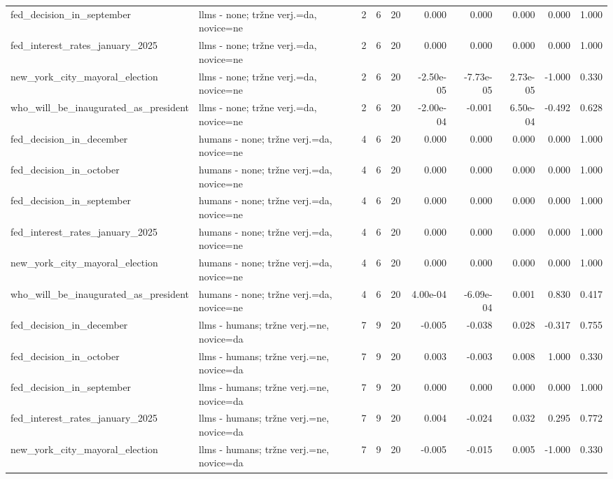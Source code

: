 \begin{longtable}{llrrrrrrrr}
fed\_decision\_in\_september & llms - none; tržne verj.=da, novice=ne & 2 & 6 & 20 & 0.000 & 0.000 & 0.000 & 0.000 & 1.000 \\
fed\_interest\_rates\_january\_2025 & llms - none; tržne verj.=da, novice=ne & 2 & 6 & 20 & 0.000 & 0.000 & 0.000 & 0.000 & 1.000 \\
new\_york\_city\_mayoral\_election & llms - none; tržne verj.=da, novice=ne & 2 & 6 & 20 & -2.50e-05 & -7.73e-05 & 2.73e-05 & -1.000 & 0.330 \\
who\_will\_be\_inaugurated\_as\_president & llms - none; tržne verj.=da, novice=ne & 2 & 6 & 20 & -2.00e-04 & -0.001 & 6.50e-04 & -0.492 & 0.628 \\
fed\_decision\_in\_december & humans - none; tržne verj.=da, novice=ne & 4 & 6 & 20 & 0.000 & 0.000 & 0.000 & 0.000 & 1.000 \\
fed\_decision\_in\_october & humans - none; tržne verj.=da, novice=ne & 4 & 6 & 20 & 0.000 & 0.000 & 0.000 & 0.000 & 1.000 \\
fed\_decision\_in\_september & humans - none; tržne verj.=da, novice=ne & 4 & 6 & 20 & 0.000 & 0.000 & 0.000 & 0.000 & 1.000 \\
fed\_interest\_rates\_january\_2025 & humans - none; tržne verj.=da, novice=ne & 4 & 6 & 20 & 0.000 & 0.000 & 0.000 & 0.000 & 1.000 \\
new\_york\_city\_mayoral\_election & humans - none; tržne verj.=da, novice=ne & 4 & 6 & 20 & 0.000 & 0.000 & 0.000 & 0.000 & 1.000 \\
who\_will\_be\_inaugurated\_as\_president & humans - none; tržne verj.=da, novice=ne & 4 & 6 & 20 & 4.00e-04 & -6.09e-04 & 0.001 & 0.830 & 0.417 \\
fed\_decision\_in\_december & llms - humans; tržne verj.=ne, novice=da & 7 & 9 & 20 & -0.005 & -0.038 & 0.028 & -0.317 & 0.755 \\
fed\_decision\_in\_october & llms - humans; tržne verj.=ne, novice=da & 7 & 9 & 20 & 0.003 & -0.003 & 0.008 & 1.000 & 0.330 \\
fed\_decision\_in\_september & llms - humans; tržne verj.=ne, novice=da & 7 & 9 & 20 & 0.000 & 0.000 & 0.000 & 0.000 & 1.000 \\
fed\_interest\_rates\_january\_2025 & llms - humans; tržne verj.=ne, novice=da & 7 & 9 & 20 & 0.004 & -0.024 & 0.032 & 0.295 & 0.772 \\
new\_york\_city\_mayoral\_election & llms - humans; tržne verj.=ne, novice=da & 7 & 9 & 20 & -0.005 & -0.015 & 0.005 & -1.000 & 0.330 \\

\end{longtable}
